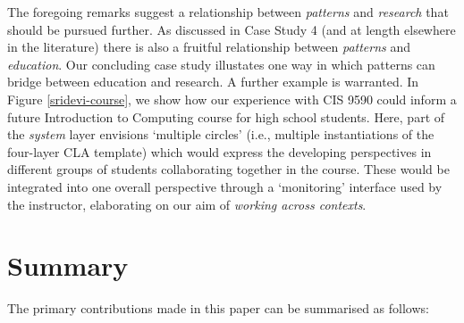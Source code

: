 \documentclass[acmlarge,timestamp]{acmart}
\begin{document}
The foregoing remarks suggest a relationship between \emph{patterns}
and \emph{research} that should be pursued further.  As discussed in
Case Study 4 (and at length elsewhere in the literature) there is also
a fruitful relationship between \emph{patterns} and \emph{education}.
Our concluding case study illustates one way in which patterns can
bridge between education and research.  A further example is
warranted.  In Figure \ref{sridevi-course}, we show how our experience
with CIS 9590 could inform a future Introduction to Computing course
for high school students.  Here, part of the \emph{system} layer
envisions ‘multiple circles’ (i.e., multiple instantiations of the
four-layer CLA template) which would express the developing
perspectives in different groups of students collaborating together in
the course.  These would be integrated into one overall perspective
through a ‘monitoring’ interface used by the instructor, elaborating
on our aim of \emph{working across contexts}.



\FloatBarrier



\section{Summary}

The primary contributions made in this paper can be summarised as
follows:
\end{document}
